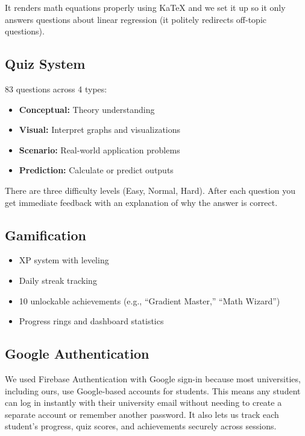 \documentclass[12pt, a4paper]{article}
\begin{document}
It renders math equations properly using KaTeX and we set it up so it only answers questions about linear regression (it politely redirects off-topic questions).

\subsection{Quiz System}

83 questions across 4 types:
\begin{itemize}
    \item \textbf{Conceptual:} Theory understanding
    \item \textbf{Visual:} Interpret graphs and visualizations
    \item \textbf{Scenario:} Real-world application problems
    \item \textbf{Prediction:} Calculate or predict outputs
\end{itemize}

There are three difficulty levels (Easy, Normal, Hard). After each question you get immediate feedback with an explanation of why the answer is correct.

\subsection{Gamification}

\begin{itemize}
    \item XP system with leveling
    \item Daily streak tracking
    \item 10 unlockable achievements (e.g., ``Gradient Master,'' ``Math Wizard'')
    \item Progress rings and dashboard statistics
\end{itemize}

\subsection{Google Authentication}

We used Firebase Authentication with Google sign-in because most universities, including ours, use Google-based accounts for students. This means any student can log in instantly with their university email without needing to create a separate account or remember another password. It also lets us track each student's progress, quiz scores, and achievements securely across sessions.

\end{document}
